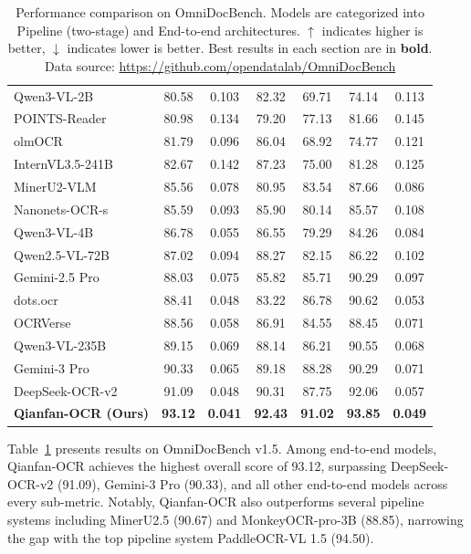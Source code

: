 \documentclass[dvipsnames]{article}
\begin{document}
\begin{table}[htbp]
\begin{tabular}{l|c|c|c|c|c|c}
Qwen3-VL-2B & 80.58 & 0.103 & 82.32 & 69.71 & 74.14 & 0.113 \\
POINTS-Reader & 80.98 & 0.134 & 79.20 & 77.13 & 81.66 & 0.145 \\
olmOCR & 81.79 & 0.096 & 86.04 & 68.92 & 74.77 & 0.121 \\
InternVL3.5-241B & 82.67 & 0.142 & 87.23 & 75.00 & 81.28 & 0.125 \\
MinerU2-VLM & 85.56 & 0.078 & 80.95 & 83.54 & 87.66 & 0.086 \\
Nanonets-OCR-s & 85.59 & 0.093 & 85.90 & 80.14 & 85.57 & 0.108 \\
Qwen3-VL-4B & 86.78 & 0.055 & 86.55 & 79.29 & 84.26 & 0.084 \\
Qwen2.5-VL-72B & 87.02 & 0.094 & 88.27 & 82.15 & 86.22 & 0.102 \\
Gemini-2.5 Pro & 88.03 & 0.075 & 85.82 & 85.71 & 90.29 & 0.097 \\
dots.ocr & 88.41 & 0.048 & 83.22 & 86.78 & 90.62 & 0.053 \\
OCRVerse & 88.56 & 0.058 & 86.91 & 84.55 & 88.45 & 0.071 \\
Qwen3-VL-235B & 89.15 & 0.069 & 88.14 & 86.21 & 90.55 & 0.068 \\
Gemini-3 Pro & 90.33 & 0.065 & 89.18 & 88.28 & 90.29 & 0.071 \\
DeepSeek-OCR-v2 & 91.09 & 0.048 & 90.31 & 87.75 & 92.06 & 0.057 \\
\textbf{Qianfan-OCR (Ours)} & \textbf{93.12} & \textbf{0.041} & \textbf{92.43} & \textbf{91.02} & \textbf{93.85} & \textbf{0.049} \\
\bottomrule
\end{tabular}
\caption{Performance comparison on OmniDocBench. Models are categorized into Pipeline (two-stage) and End-to-end architectures. $\uparrow$ indicates higher is better, $\downarrow$ indicates lower is better. Best results in each section are in \textbf{bold}. Data source: \url{https://github.com/opendatalab/OmniDocBench}}
\label{tab:omnidocbench}
\end{table}

Table~\ref{tab:omnidocbench} presents results on OmniDocBench v1.5. Among end-to-end models, Qianfan-OCR achieves the highest overall score of 93.12, surpassing DeepSeek-OCR-v2 (91.09), Gemini-3 Pro (90.33), and all other end-to-end models across every sub-metric. Notably, Qianfan-OCR also outperforms several pipeline systems including MinerU2.5 (90.67) and MonkeyOCR-pro-3B (88.85), narrowing the gap with the top pipeline system PaddleOCR-VL 1.5 (94.50).
\end{document}
